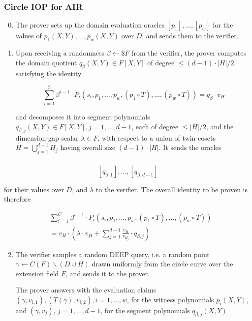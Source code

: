 \documentclass{beamer}
\begin{document}
\begin{frame}
	\frametitle{Circle IOP for AIR}
	\begin{enumerate}
		\setcounter{enumi}{-1}
		\item The prover sets up the domain evaluation oracles $\left[p_1\right], \ldots,\left[p_w\right]$ for the values of $p_1(X, Y), \ldots, p_w(X, Y)$ over $D$, and sends them to the verifier.
		\item Upon receiving a randomness $\beta \leftarrow \$ F$ from the verifier, the prover computes the domain quotient $q_\beta(X, Y) \in F[X, Y]$ of degree $\leq(d-1) \cdot|H| / 2$ satisfying the identity

$$
\sum_{i=1}^C \beta^{i-1} \cdot P_i\left(s_i, p_1, \ldots, p_w,\left(p_1 \circ T\right), \ldots,\left(p_w \circ T\right)\right)=q_\beta \cdot v_H
$$

and decomposes it into segment polynomials $q_{\beta, j}(X, Y) \in F[X, Y], j=1, \ldots, d-1$, each of degree $\leq|H| / 2$, and the dimension-gap scalar $\lambda \in F$, with respect to a union of twin-cosets $\bar{H}=\bigcup_{j=1}^{d-1} H_j$ having overall size $(d-1) \cdot|H|$.  It sends the oracles

	\end{enumerate}


\end{frame}
\begin{frame}
	\frametitle{}
	$$
\left[q_{\beta, 1}\right], \ldots,\left[q_{\beta, d-1}\right]
$$

for their values over $D$, and $\lambda$ to the verifier. The overall identity to be proven is therefore

$$
\begin{aligned}
	&\sum_{i=1}^C \beta^{i-1} \cdot P_i\left(s_i, p_1, \ldots, p_w,\left(p_1 \circ T\right), \ldots,\left(p_w \circ T\right)\right)\\
&=v_H \cdot\left(\lambda \cdot v_{\bar{H}}+\sum_{j=1}^{d-1} \frac{v_{\bar{H}}}{v_{H_j}} \cdot q_{\beta, j}\right)
\end{aligned}
$$

\begin{enumerate}
	\setcounter{enumi}{1}
	\item The verifier samples a random DEEP query, i.e. a random point $\gamma \longleftarrow C(F) \backslash(D \cup H)$ drawn uniformly from the circle curve over the extension field $F$, and sends it to the prover. 

	The prover answers with the evaluation claims $\left(\gamma, v_{i, 1}\right),\left(T(\gamma), v_{i, 2}\right), i=1, \ldots, w$, for the witness polynomials $p_i(X, Y)$, and $\left(\gamma, v_j\right)$, $j=1, \ldots, d-1$, for the segment polynomials $q_{\beta, j}(X, Y)$
\end{enumerate}

\end{frame}
\end{document}
